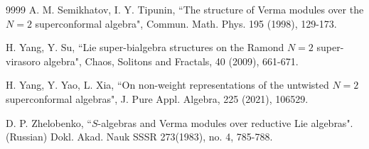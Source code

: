 \documentclass[12pt]{article}
\numberwithin{equation}{section}
\begin{document}
\begin{thebibliography}{9999}
 A. M. Semikhatov, I. Y. Tipunin,  ``The structure of Verma modules over the $N=2$ superconformal algebra",
Commun. Math. Phys. 195 (1998), 129-173.

 H. Yang, Y. Su,  ``Lie super-bialgebra structures on the Ramond $N=2$ super-virasoro algebra", Chaos, Solitons and Fractals, 40 (2009), 661-671.

 H. Yang, Y. Yao, L. Xia,  ``On non-weight representations of the untwisted $N=2$ superconformal algebras",
J. Pure Appl. Algebra, 225 (2021), 106529.

  D. P. Zhelobenko,  ``$S$-algebras and Verma modules over reductive Lie algebras". (Russian) Dokl. Akad. Nauk SSSR 273(1983), no. 4, 785-788.

\end{thebibliography}
\end{document}

